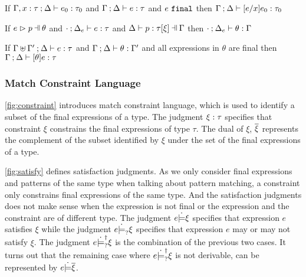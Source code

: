 \begin{lemma}[Substitution]
  \label{lemma:substitution}
  If $\Gamma, x : \tau \mathbin{;} \Delta \vdash e_0 : \tau_0$ and $\Gamma \mathbin{;} \Delta \vdash e : \tau$ and $e ~\mathtt{final}$
  then $\Gamma \mathbin{;} \Delta \vdash [e/x]e_0 : \tau_0$
\end{lemma}

\begin{lemma}
  \label{lemma:subs-typing}
  If $\hpatmatch{e}{p}{\theta}$ and $\cdot \mathbin{;} \Delta_e \vdash e : \tau$ and $\chpattyp{p}{\tau}{\xi}{\Gamma}{\Delta}$ then $\cdot \mathbin{;} \Delta_e \vdash \theta : \Gamma$
\end{lemma}

\begin{lemma}
  \label{lemma:simult-substitution}
  If $\Gamma \uplus \Gamma' \mathbin{;} \Delta \vdash e : \tau$ and $\Gamma \mathbin{;} \Delta \vdash \theta : \Gamma'$ and all expressions in $\theta$ are final
  then $\Gamma \mathbin{;} \Delta \vdash [\theta]e : \tau$
\end{lemma}

\subsubsection{Match Constraint Language}\label{sec:constraint}


\autoref{fig:constraint} introduces match constraint language, which is
used to identify a subset of the final expressions of a type. The judgment
$\xi : \tau$ specifies that constraint $\xi$ constrains the final
expressions of type $\tau$. The dual of $\xi$, $\overline{\xi}$ represents the
complement of the subset identified by $\xi$ under the set of the final
expressions of a type.




\autoref{fig:satisfy} defines satisfaction judgments. As we only
consider final expressions and patterns of the same type when talking about
pattern matching, a constraint only constrains final expressions of the same
type. And the satisfaction judgments does not make sense when the expression is
not final or the expression and the constraint are of different type. The
judgment $e \dot{\models} \xi$ specifies that expression $e$ satisfies $\xi$ while
the judgment $e \dot{\models}_{?} \xi$ specifies that expression $e$ may or may not
satisfy $\xi$. The judgment $e \dot{\models}_{?}^{\dag} \xi$ is the combination of the
previous two cases. It turns out that the remaining case where
$e \dot{\models}_{?}^{\dag} \xi$ is not derivable, can be represented by
$e \dot{\models} \overline{\xi}$.

